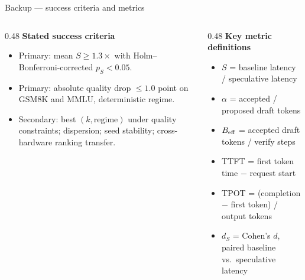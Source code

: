 \documentclass[aspectratio=169, 11pt]{beamer}
\begin{document}
\begin{frame}{Backup --- success criteria and metrics}
  \begin{columns}[T,onlytextwidth]
    \begin{column}{0.48\textwidth}
      \small
      \textbf{Stated success criteria}
      \begin{itemize}\itemsep2pt
        \item Primary: mean $S \ge 1.3\times$ with Holm--Bonferroni-corrected
              $p_S < 0.05$.
        \item Primary: absolute quality drop $\le 1.0$ point on GSM8K and
              MMLU, deterministic regime.
        \item Secondary: best $(k, \text{regime})$ under quality constraints;
              dispersion; seed stability; cross-hardware ranking transfer.
      \end{itemize}
    \end{column}
    \begin{column}{0.48\textwidth}
      \small
      \textbf{Key metric definitions}
      \begin{itemize}\itemsep2pt
        \item $S$ = baseline latency / speculative latency
        \item $\alpha$ = accepted / proposed draft tokens
        \item $B_{\text{eff}}$ = accepted draft tokens / verify steps
        \item TTFT = first token time $-$ request start
        \item TPOT = (completion $-$ first token) / output tokens
        \item $d_S$ = Cohen's $d$, paired baseline vs.\ speculative latency
      \end{itemize}
    \end{column}
  \end{columns}
\end{frame}
\end{document}
